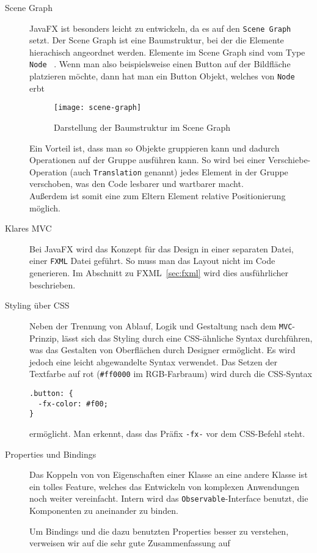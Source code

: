 \begin{description}
\item[Scene Graph] JavaFX ist besonders leicht zu entwickeln, da es auf den \texttt{Scene Graph} setzt. Der Scene Graph ist eine Baumstruktur, bei der die Elemente hierachisch angeordnet werden. Elemente im Scene Graph sind vom Type \texttt{Node} ~\cite{ProJavaFX8}. Wenn man also beispielsweise einen Button auf der Bildfläche platzieren möchte, dann hat man ein Button Objekt, welches von \texttt{Node} erbt

\begin{figure}[!htb]
    \centering
      \texttt{[image: scene-graph]}
    \caption{Darstellung der Baumstruktur im Scene Graph}
    \label{fig:scene-graph}
\end{figure}

Ein Vorteil ist, dass man so Objekte gruppieren kann und dadurch Operationen auf der Gruppe ausführen kann. So wird bei einer Verschiebe-Operation (auch \texttt{Translation} genannt) jedes Element in der Gruppe verschoben, was den Code lesbarer und wartbarer macht.\\
Außerdem ist somit eine zum Eltern Element relative Positionierung möglich.

\item[Klares MVC] Bei JavaFX wird das Konzept für das Design in einer separaten Datei, einer \texttt{FXML} Datei geführt. So muss man das Layout nicht im Code generieren. Im Abschnitt zu FXML~\ref{sec:fxml} wird dies ausführlicher beschrieben.

\item[Styling über CSS] Neben der Trennung von Ablauf, Logik und Gestaltung nach dem \texttt{MVC}-Prinzip, lässt sich das Styling durch eine CSS-ähnliche Syntax durchführen, was das Gestalten von Oberflächen durch Designer ermöglicht. Es wird jedoch eine leicht abgewandelte Syntax verwendet. Das Setzen der Textfarbe auf rot (\texttt{\#ff0000} im RGB-Farbraum) wird durch die CSS-Syntax
\begin{verbatim}
.button: {
  -fx-color: #f00;
}
\end{verbatim}
ermöglicht. Man erkennt, dass das Präfix \texttt{-fx-} vor dem CSS-Befehl steht.

\item[Properties und Bindings] Das Koppeln von von Eigenschaften einer Klasse an eine andere Klasse ist ein tolles Feature, welches das Entwickeln von komplexen Anwendungen noch weiter vereinfacht. Intern wird das \texttt{Observable}-Interface benutzt, die Komponenten zu aneinander zu binden.

Um Bindings und die dazu benutzten Properties besser zu verstehen, verweisen wir auf die sehr gute Zusammenfassung auf \cite{JavaBeginner-Binding}
\end{description}

